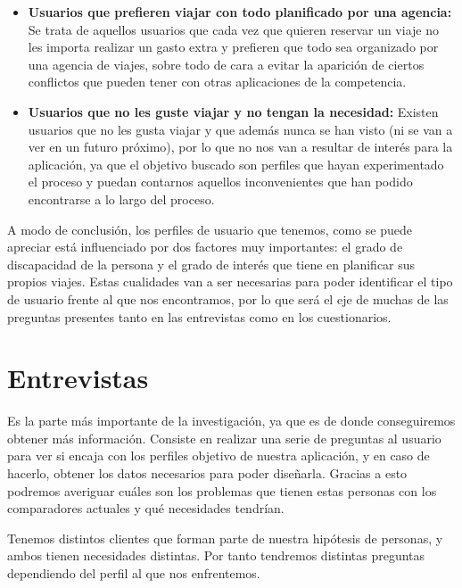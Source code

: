 \begin{itemize}
    \item {\textbf{Usuarios que prefieren viajar con todo planificado por una agencia:}} Se trata de aquellos usuarios que cada vez que quieren
        reservar un viaje no les importa realizar un gasto extra y prefieren que todo sea organizado por una agencia de viajes, sobre todo de cara a
        evitar la aparición de ciertos conflictos que pueden tener con otras aplicaciones de la competencia.
    \item {\textbf{Usuarios que no les guste viajar y no tengan la necesidad:}} Existen usuarios que no les gusta viajar y que además nunca se han visto
        (ni se van a ver en un futuro próximo), por lo que no nos van a resultar de interés para la aplicación, ya que el objetivo buscado son perfiles que
        hayan experimentado el proceso y puedan contarnos aquellos inconvenientes que han podido encontrarse a lo largo del proceso.
\end{itemize}
 
A modo de conclusión, los perfiles de usuario que tenemos, como se puede apreciar está influenciado por dos factores muy importantes: el grado de discapacidad de la persona
y el grado de interés que tiene en planificar sus propios viajes. Estas cualidades van a ser necesarias para poder identificar el tipo de usuario frente al que nos encontramos,
por lo que será el eje de muchas de las preguntas presentes tanto en las entrevistas como en los cuestionarios.


\section{Entrevistas}

Es la parte más importante de la investigación, ya que es de donde conseguiremos obtener más información. Consiste en realizar una serie de preguntas al usuario para
ver si encaja con los perfiles objetivo de nuestra aplicación, y en caso de hacerlo, obtener los datos necesarios para poder diseñarla. Gracias a esto podremos averiguar
cuáles son los problemas que tienen estas personas con los comparadores actuales y qué necesidades tendrían.

Tenemos distintos clientes que forman parte de nuestra hipótesis de personas, y ambos tienen necesidades distintas. Por tanto tendremos distintas preguntas
dependiendo del perfil al que nos enfrentemos.

